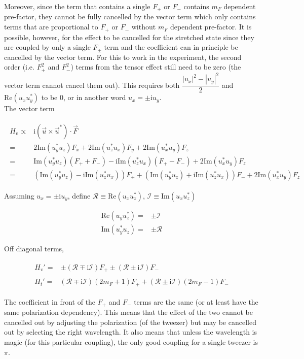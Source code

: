 \documentclass[10pt,fleqn]{article}
\newcommand{\ui}{\mathrm{i}}
\newcommand{\eqar}[1]
{
  \begin{align}
    #1
  \end{align}
}
\newcommand{\paren}[1]{{\left({#1}\right)}}
\newcommand{\abs}[1]{{\left|{#1}\right|}}
\begin{document}
Moreover, since the term that contains a single $F_+$ or $F_-$
contains $m_F$ dependent pre-factor, they cannot be fully cancelled
by the vector term which only contains terms that are proportional to $F_+$ or $F_-$
without $m_F$ dependent pre-factor.
It is possible, however, for the effect to be cancelled for the stretched state
since they are coupled by only a single $F_\pm$ term and the coefficient can
in principle be cancelled by the vector term. For this to work in the experiment,
the second order (i.e. $F_+^2$ and $F_-^2$) terms from the tensor effect
still need to be zero (the vector term cannot cancel them out).
This requires both $\dfrac{\abs{u_x}^2-\abs{u_y}^2}{2}$ and
$\mathrm{Re}\paren{u_xu_y^*}$ to be $0$, or in another word $u_x=\pm\ui u_y$.\\

The vector term
\eqar{
  \begin{split}
    H_v\propto&\ui\paren{\vec{u}\times\vec{u}^*}\cdot\vec F\\
    =&2\mathrm{Im}\paren{u_y^*u_z}F_x
       +2\mathrm{Im}\paren{u_z^*u_x}F_y
       +2\mathrm{Im}\paren{u_x^*u_y}F_z\\
    =&\mathrm{Im}\paren{u_y^*u_z}\paren{F_++F_-}
       -\ui\mathrm{Im}\paren{u_z^*u_x}\paren{F_+-F_-}
       +2\mathrm{Im}\paren{u_x^*u_y}F_z\\
    =&\paren{\mathrm{Im}\paren{u_y^*u_z}-\ui\mathrm{Im}\paren{u_z^*u_x}}F_+
       +\paren{\mathrm{Im}\paren{u_y^*u_z}+\ui\mathrm{Im}\paren{u_z^*u_x}}F_-
       +2\mathrm{Im}\paren{u_x^*u_y}F_z
  \end{split}
}

Assuming $u_x=\pm\ui u_y$, define $\mathcal{R}\equiv\mathrm{Re}\paren{u_xu_z^*}$,
$\mathcal{I}\equiv\mathrm{Im}\paren{u_xu_z^*}$
\eqar{
  \mathrm{Re}\paren{u_yu_z^*}=&\pm\mathcal{I}\\
  \mathrm{Im}\paren{u_y^*u_z}=&\pm\mathcal{R}
}

Off diagonal terms,
\eqar{
  \begin{split}
    H_v'=&\pm\paren{\mathcal{R}\mp\ui\mathcal{I}}F_+
       \pm\paren{\mathcal{R}\pm\ui\mathcal{I}}F_-
  \end{split}\\
  \begin{split}
    H_t'=&\paren{\mathcal{R}\mp\ui\mathcal{I}}\paren{2m_F+1}F_+
           +\paren{\mathcal{R}\pm\ui\mathcal{I}}\paren{2m_F-1}F_-
  \end{split}
}

The coefficient in front of the $F_+$ and $F_-$ terms are the same
(or at least have the same polarization dependency).
This means that the effect of the two cannot be cancelled out
by adjusting the polarization (of the tweezer) but may be cancelled out
by selecting the right wavelength. It also means that unless the wavelength is magic
(for this particular coupling), the only good coupling for a single tweezer
is $\pi$.
\end{document}
